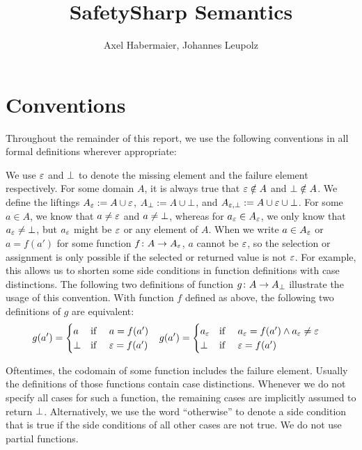 \documentclass[a4paper,10pt,english]{article}
\title{SafetySharp Semantics}
\author{Axel Habermaier, Johannes Leupolz}
\begin{document}
\maketitle

\section{Conventions}
Throughout the remainder of this report, we use the following conventions in all formal definitions wherever appropriate:

	We use $\varepsilon$ and $\bot$ to denote the missing element and the failure element respectively. For some domain $A$, it is
	always true that $\varepsilon \notin A$ and $\bot \notin A$. We define the liftings $A_\varepsilon := A \cup
	\varepsilon$, $A_\bot := A \cup \bot$, and $A_{\varepsilon, \bot} := A \cup \varepsilon \cup	\bot$.
	For some $a \in A$, we know that $a \neq \varepsilon$ and $a \neq \bot$, whereas for $a_\varepsilon \in
	A_\varepsilon$, we only know that $a_\varepsilon \neq \bot$, but $a_\varepsilon$ might be $\varepsilon$ or
	any element of $A$. When we write $a \in A_\varepsilon$ or $a = f(a')$ for some function $f \colon A \rightarrow
	A_\varepsilon$, $a$ cannot be $\varepsilon$, so the selection or assignment is only possible if the selected or
	returned value is not $\varepsilon$. For example, this allows us to shorten some side conditions in function definitions with case
	distinctions. The following two definitions of function $g \colon A \rightarrow A_\bot$ illustrate the usage of this
	convention.
	With function $f$ defined as above, the following two definitions of $g$ are equivalent:
	\begin{align*}
		g(a') = \begin{cases}
			a & \text{if } \quad a = f(a') \\
			\bot & \text{if } \quad \varepsilon = f(a')
		\end{cases}
		&&&
		g(a') = \begin{cases}
			a_\varepsilon & \text{if } \quad a_\varepsilon = f(a') \wedge a_\varepsilon \neq \varepsilon	\\
			\bot & \text{if } \quad \varepsilon = f(a')
		\end{cases}
	\end{align*}

	Oftentimes, the codomain of some function includes the failure element. Usually the definitions of those functions contain case distinctions.
	Whenever we do not specify all cases for such a function, the remaining cases are implicitly assumed to return $\bot$.
	Alternatively, we use the word ``otherwise'' to denote a side condition that is true if the side conditions of all other cases are not true. We do not use partial functions.
\end{document}
